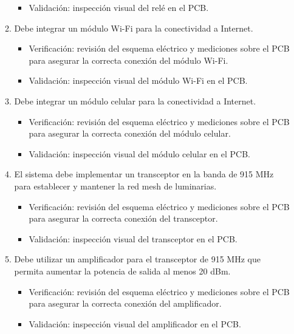 \documentclass[
11pt, %
]{charter}
\begin{document}
\begin{enumerate}
\begin{enumerate}
\begin{itemize}
				\item Validación: inspección visual del relé en el PCB.
				\end{itemize}
			\item Debe integrar un módulo Wi-Fi para la conectividad a Internet.
				\begin{itemize}
				\item Verificación: revisión del esquema eléctrico y mediciones sobre el PCB para asegurar la correcta conexión del módulo Wi-Fi. 
				\item Validación: inspección visual del módulo Wi-Fi en el PCB.
				\end{itemize}
			\item Debe integrar un módulo celular para la conectividad a Internet.
				\begin{itemize}
				\item Verificación: revisión del esquema eléctrico y mediciones sobre el PCB para asegurar la correcta conexión del módulo celular. 
				\item Validación: inspección visual del módulo celular en el PCB.
				\end{itemize}
			\item El sistema debe implementar un transceptor en la banda de 915 MHz para establecer y mantener la red mesh de luminarias.
				\begin{itemize}
				\item Verificación: revisión del esquema eléctrico y mediciones sobre el PCB para asegurar la correcta conexión del transceptor. 
				\item Validación: inspección visual del transceptor en el PCB.
				\end{itemize}
			\item Debe utilizar un amplificador para el transceptor de 915 MHz que permita aumentar la potencia de salida al menos 20 dBm.
				\begin{itemize}
				\item Verificación: revisión del esquema eléctrico y mediciones sobre el PCB para asegurar la correcta conexión del amplificador. 
				\item Validación: inspección visual del amplificador en el PCB.
				\end{itemize}


\end{enumerate}
\end{enumerate}
\end{document}
